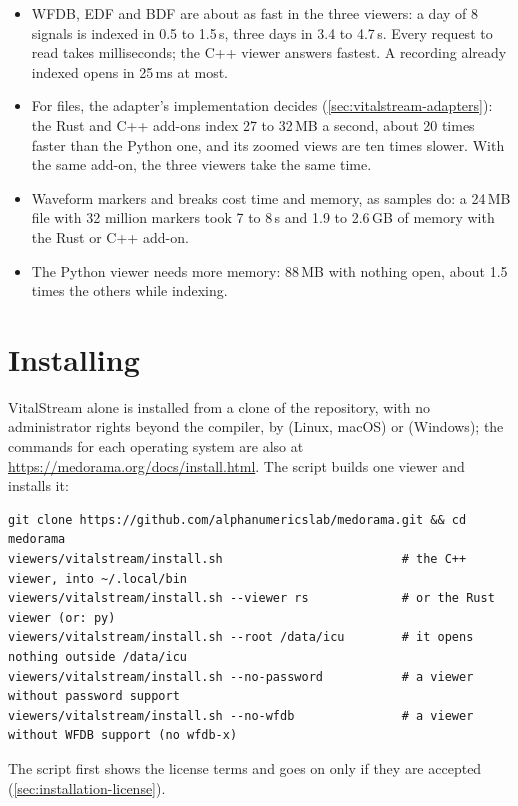 \begin{itemize}
\item WFDB, EDF and BDF are about as fast in the three viewers: a day of 8 signals is indexed in
  0.5 to 1.5\,s, three days in 3.4 to 4.7\,s. Every request to read takes milliseconds; the C++
  viewer answers fastest. A recording already indexed opens in 25\,ms at most.
\item For  files, the adapter's implementation decides (\cref{sec:vitalstream-adapters}):
  the Rust and C++ add-ons index 27 to 32\,MB a second, about 20 times faster than the Python
  one, and its zoomed views are ten times slower. With the same add-on, the three viewers take the
  same time.
\item Waveform markers and breaks cost time and memory, as samples do: a 24\,MB file with 32
  million markers took 7 to 8\,s and 1.9 to 2.6\,GB of memory with the Rust or C++ add-on.
\item The Python viewer needs more memory: 88\,MB with nothing open, about 1.5 times the others
  while indexing.
\end{itemize}

\section{Installing}
\label{sec:vitalstream-install}

VitalStream alone is installed from a clone of the repository, with no administrator rights
beyond the compiler, by  (Linux, macOS) or
 (Windows); the commands for each operating system are
also at \url{https://medorama.org/docs/install.html}. The script builds one viewer and installs it:

\begin{lstlisting}[style=shell]
git clone https://github.com/alphanumericslab/medorama.git && cd medorama
viewers/vitalstream/install.sh                         # the C++ viewer, into ~/.local/bin
viewers/vitalstream/install.sh --viewer rs             # or the Rust viewer (or: py)
viewers/vitalstream/install.sh --root /data/icu        # it opens nothing outside /data/icu
viewers/vitalstream/install.sh --no-password           # a viewer without password support
viewers/vitalstream/install.sh --no-wfdb               # a viewer without WFDB support (no wfdb-x)
\end{lstlisting}
The script first shows the license terms and goes on only if they are accepted
(\cref{sec:installation-license}).

